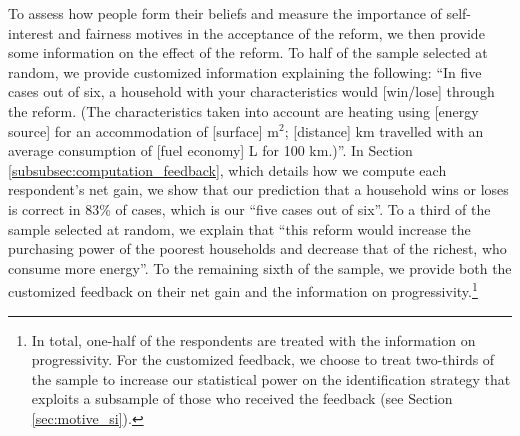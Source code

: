 \documentclass[12pt]{article} %
\begin{document}

To assess how people form their beliefs and measure the importance of self-interest and fairness motives in the acceptance of the reform, we then provide some information on the effect of the reform. To half of the sample selected at random, we provide customized information explaining the following: ``In five cases out of six, a household with your characteristics would {[}win/lose{]} through the reform. (The characteristics taken into account are heating using {[}energy source{]} for an accommodation of {[}surface{]} m$^{2}$; {[}distance{]} km travelled with an average consumption of {[}fuel economy{]} L for 100 km.)''. In Section \ref{subsubsec:computation_feedback}, which details how we compute each respondent's net gain, we show that our prediction that a household wins or loses is correct in 83\% of cases, which is our ``five cases out of six''. To a third of the sample selected at random, we explain that ``this reform would increase the purchasing power of the poorest households and decrease that of the richest, who consume more energy''. To the remaining sixth of the sample, we provide both the customized feedback on their net gain and the information on progressivity.\footnote{In total, one-half of the respondents are treated with the information on progressivity. For the customized feedback, we choose to treat two-thirds of the sample to increase our statistical power on the identification strategy that exploits a subsample of those who received the feedback (see Section \ref{sec:motive_si}).}
\end{document}
